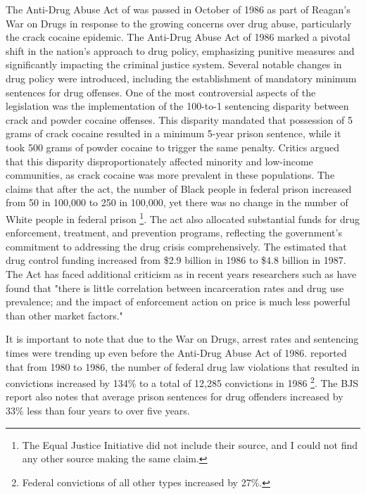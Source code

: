 \documentclass{article}
\begin{document}
The Anti-Drug Abuse Act of \citeyear{antidrugabuseact1986} was passed in October of 1986 as part of Reagan's War on Drugs in response to the growing concerns over drug abuse, particularly the crack cocaine epidemic. The Anti-Drug Abuse Act of 1986 marked a pivotal shift in the nation's approach to drug policy, emphasizing punitive measures and significantly impacting the criminal justice system. Several notable changes in drug policy were introduced, including the establishment of mandatory minimum sentences for drug offenses. One of the most controversial aspects of the legislation was the implementation of the 100-to-1 sentencing disparity between crack and powder cocaine offenses. This disparity mandated that possession of 5 grams of crack cocaine resulted in a minimum 5-year prison sentence, while it took 500 grams of powder cocaine to trigger the same penalty. Critics argued that this disparity disproportionately affected minority and low-income communities, as crack cocaine was more prevalent in these populations. The \cite{eji} claims that after the act, the number of Black people in federal prison increased from 50 in 100,000 to 250 in 100,000, yet there was no change in the number of White people in federal prison \footnote{The Equal Justice Initiative did not include their source, and I could not find any other source making the same claim.}. The act also allocated substantial funds for drug enforcement, treatment, and prevention programs, reflecting the government's commitment to addressing the drug crisis comprehensively. The \cite{drug_control_money} estimated that drug control funding increased from \$2.9 billion in 1986 to \$4.8 billion in 1987. The Act has faced additional criticism as in recent years researchers such as \cite{bewley2005incarceration} have found that "there is little correlation between incarceration rates and drug use prevalence; and the impact of enforcement action on price is much less powerful than other market factors."

It is important to note that due to the War on Drugs, arrest rates and sentencing times were trending up even before the Anti-Drug Abuse Act of 1986. \cite{bjs_1986} reported that from 1980 to 1986, the number of federal drug law violations that resulted in convictions increased by 134\% to a total of 12,285 convictions in 1986 \footnote{Federal convictions of all other types increased by 27\%.}. The BJS report also notes that average prison sentences for drug offenders increased by 33\% less than four years to over five years.
\end{document}
